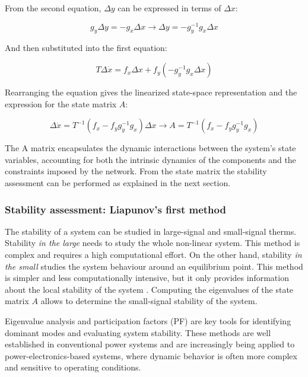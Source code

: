 From the second equation, $\Delta y$ can be expressed in terms of $\Delta x$:

\begin{equation}
    g_y\Delta y = -g_x \Delta x  \to \Delta y = - g_y^{-1} g_x \Delta x 
\end{equation}

And then substituted into the first equation:

\begin{equation}
    T \Delta \dot{x} = f_x\Delta x +f_y (- g_y^{-1} g_x  \Delta x) 
\end{equation}


Rearranging the equation gives the linearized state-space representation and the expression for the state matrix $A$:

\begin{equation}
    \Delta \dot{x} = T^{-1}(f_x-f_yg_y^{-1}g_x) \Delta x  \to A=T^{-1} (f_x-f_yg_y^{-1}g_x) 
\end{equation}


The A matrix encapsulates the dynamic interactions between the system's state variables, accounting for both the intrinsic dynamics of the components and the constraints imposed by the network. 
From the state matrix the stability assessment can be performed as explained in the next section.

\subsubsection{Stability assessment: Liapunov's first method}

The stability of a system can be studied in large-signal and small-signal therms. Stability \textit{in the large} needs to study the whole non-linear system. This method is complex and requires a high
computational effort. On the other hand, stability \textit{in the small} studies the system behaviour around an equilibrium point. This method is simpler and less computationally intensive, but it only 
provides information about the local stability of the system \cite{StabilityAndControlKundur}. Computing the eigenvalues of the state matrix $A$ allows to determine the small-signal stability of the system.

Eigenvalue analysis and participation factors (PF) are key tools for identifying dominant modes and evaluating system stability. These methods are well established in conventional 
power systems and are increasingly being applied to power-electronics-based systems, where dynamic behavior is often more complex and sensitive to operating conditions.

